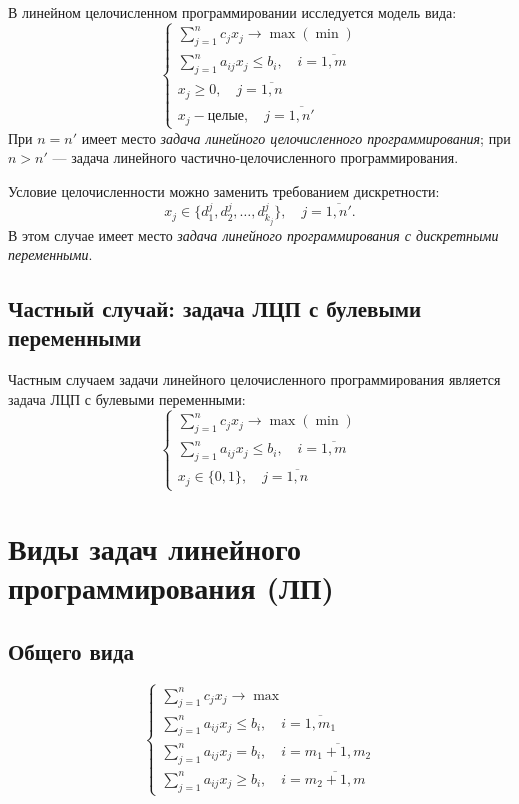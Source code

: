 \documentclass[17pt]{extarticle}
\begin{document}
В линейном целочисленном программировании исследуется модель вида:
\[
    \begin{cases}
        \sum\limits_{j=1}^{n} c_j x_j \to \max (\min)                        \\
        \sum\limits_{j=1}^{n} a_{ij} x_{j} \le b_i, \quad i = \overline{1,m} \\
        x_j \ge 0, \quad j = \overline{1,n}                                  \\
        x_j - \text{целые}, \quad j = \overline{1,n'}
    \end{cases}
\]
При \( n = n' \) имеет место \textit{задача линейного целочисленного программирования}; при \( n > n' \) — задача линейного частично-целочисленного программирования.

Условие целочисленности можно заменить требованием дискретности:
\[
    x_j \in \{ d_1^j, d_2^j, \dots, d_{k_j}^j \}, \quad j = \overline{1, n'}.
\]
В этом случае имеет место \textit{задача линейного программирования с дискретными переменными}.

\subsection{Частный случай: задача ЛЦП с булевыми переменными}
Частным случаем задачи линейного целочисленного программирования является задача ЛЦП с булевыми переменными:
\[
    \begin{cases}
        \sum\limits_{j=1}^{n} c_j x_j \to \max (\min)                        \\
        \sum\limits_{j=1}^{n} a_{ij} x_{j} \le b_i, \quad i = \overline{1,m} \\
        x_j \in \{0,1\}, \quad j = \overline{1,n}
    \end{cases}
\]




\section{Виды задач линейного программирования (ЛП)}

\subsection{Общего вида}
\[
    \begin{cases}
        \sum\limits_{j=1}^{n} c_j x_j \to \max                                 \\
        \sum\limits_{j=1}^{n} a_{ij} x_j \le b_i, \quad i = \overline{1,m_1}   \\
        \sum\limits_{j=1}^{n} a_{ij} x_j = b_i, \quad i = \overline{m_1+1,m_2} \\
        \sum\limits_{j=1}^{n} a_{ij} x_j \ge b_i, \quad i = \overline{m_2+1,m}
    \end{cases}
\]
\end{document}
